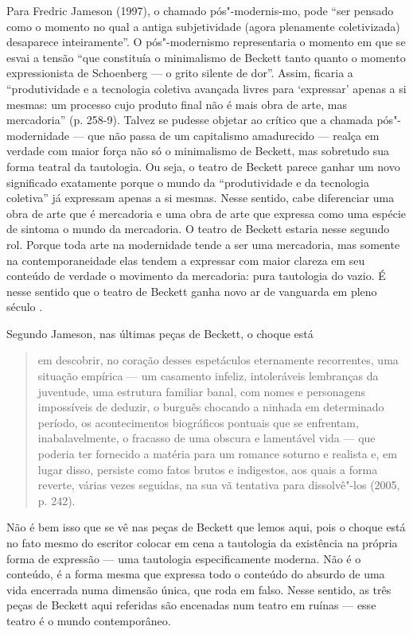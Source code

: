 Para Fredric Jameson (1997), o chamado pós"-modernis-mo, pode ``ser %
pensado como o momento no qual a antiga subjetividade (agora plenamente
coletivizada) desaparece inteiramente''. O pós"-modernismo representaria
o momento em que se esvai a tensão ``que constituía o minimalismo de
Beckett tanto quanto o momento expressionista de Schoenberg --- o grito
silente de dor''. Assim, ficaria a ``produtividade e a tecnologia
coletiva avançada livres para `expressar' apenas a si mesmas: um
processo cujo produto final não é mais obra de arte, mas mercadoria''
(p. 258-9). Talvez se pudesse objetar ao crítico que a chamada
pós"-modernidade --- que não passa de um capitalismo amadurecido --- realça
em verdade com maior força não só o minimalismo de Beckett, mas
sobretudo sua forma teatral da tautologia. Ou seja, o teatro de Beckett
parece ganhar um novo significado exatamente porque o mundo da
``produtividade e da tecnologia coletiva'' já expressam apenas a si
mesmas. Nesse sentido, cabe diferenciar uma obra de arte que é
mercadoria e uma obra de arte que expressa como uma espécie de sintoma o
mundo da mercadoria. O teatro de Beckett estaria nesse segundo rol.
Porque toda arte na modernidade tende a ser uma mercadoria, mas somente
na contemporaneidade elas tendem a expressar com maior clareza em seu
conteúdo de verdade o movimento da mercadoria: pura tautologia do vazio.
É nesse sentido que o teatro de Beckett ganha novo ar de vanguarda em
pleno século .

Segundo Jameson, nas últimas peças de Beckett, o choque está

\begin{quote}
em descobrir, no coração desses espetáculos eternamente recorrentes, uma
situação empírica --- um casamento infeliz, intoleráveis lembranças da
juventude, uma estrutura familiar banal, com nomes e personagens
impossíveis de deduzir, o burguês chocando a ninhada em determinado
período, os acontecimentos biográficos pontuais que se enfrentam,
inabalavelmente, o fracasso de uma obscura e lamentável vida --- que
poderia ter fornecido a matéria para um romance soturno e realista e, em
lugar disso, persiste como fatos brutos e indigestos, aos quais a forma
reverte, várias vezes seguidas, na sua vã tentativa para dissolvê"-los
(2005, p. 242).
\end{quote}

Não é bem isso que se vê nas peças de Beckett que lemos aqui, pois o choque está no fato mesmo do escritor colocar em cena a
tautologia da existência na própria forma de expressão --- uma tautologia
especificamente moderna. Não é o conteúdo, é a forma mesma que expressa
todo o conteúdo do absurdo de uma vida encerrada numa dimensão única,
que roda em falso. Nesse sentido, as três peças de Beckett aqui
referidas são encenadas num teatro em ruínas --- esse teatro é o mundo
contemporâneo.

